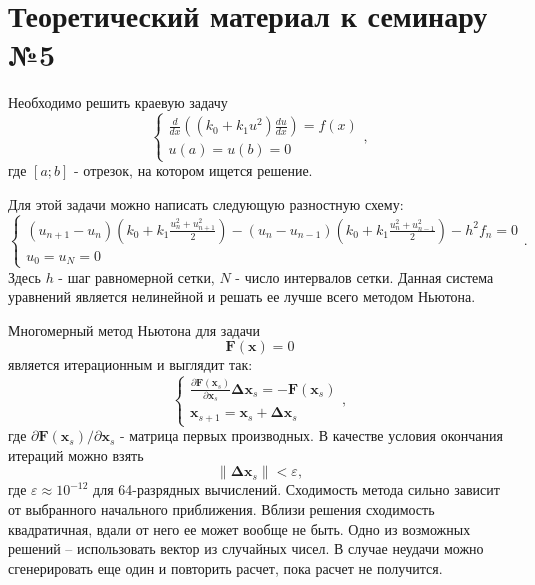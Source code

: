 \section{Теоретический материал к семинару №5}
Необходимо решить краевую задачу
\begin{equation} \label{c5eq1}
	\begin{cases}
		 \displaystyle \frac{d}{dx} \left( \left( k_0 + k_1 u^2 \right) \frac{du}{dx} \right) = f(x) \\
		u(a) = u(b) = 0
	\end{cases},
\end{equation}
где $[a; b]$ - отрезок, на котором ищется решение.

Для этой задачи можно написать следующую разностную схему:
\begin{equation} \label{c5eq2}
	\begin{cases}
		\displaystyle \left( u_{n+1} - u_n \right) \left( k_0 + k_1 \frac{u_n^2 + u_{n+1}^2}{2} \right) - \left( u_n - u_{n-1} \right) \left( k_0 + k_1 \frac{u_n^2 + u_{n-1}^2}{2} \right) - h^2 f_n = 0 \\
		u_0 = u_N = 0
	\end{cases}.
\end{equation}
Здесь $h$ - шаг равномерной сетки, $N$ - число интервалов сетки. Данная система уравнений является нелинейной и решать ее лучше всего методом Ньютона.

Многомерный метод Ньютона для задачи
\begin{equation} \label{c5eq3}
	\mathbf{F}(\mathbf{x}) = 0
\end{equation}
является итерационным и выглядит так:
\begin{equation} \label{c5eq4}
	\begin{cases}
		\displaystyle \frac{\partial \mathbf{F}(\mathbf{x}_s)}{\partial \mathbf{x}_s}  \mathbf{\Delta x}_s = -\mathbf{F}(\mathbf{x}_s)\\
		\mathbf{x}_{s+1} = \mathbf{x}_s + \mathbf{\Delta x}_s
	\end{cases},
\end{equation}
где $\displaystyle \partial \mathbf{F}(\mathbf{x}_s)/\partial \mathbf{x}_s$ - матрица первых производных. В качестве условия окончания итераций можно взять
\begin{equation} \label{c5eq5}
	\|\mathbf{\Delta x}_s\| < \varepsilon,
\end{equation}
где $\varepsilon \approx 10^{-12}$ для 64-разрядных вычислений. Сходимость метода сильно зависит от выбранного начального приближения. Вблизи решения сходимость квадратичная, вдали от него ее может вообще не быть. Одно из возможных решений – использовать вектор из случайных чисел. В случае неудачи можно сгенерировать еще один и повторить расчет, пока расчет не получится.
